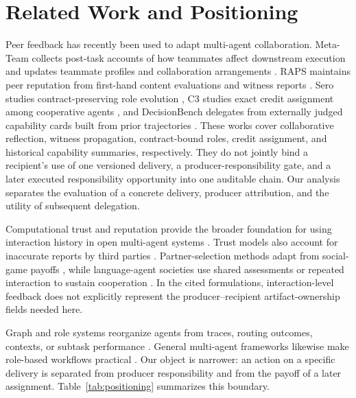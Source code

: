 \documentclass[sigconf,anonymous]{aamas}
\begin{document}
\section{Related Work and Positioning}
Peer feedback has recently been used to adapt multi-agent collaboration. Meta-Team collects post-task accounts of how teammates affect downstream execution and updates teammate profiles and collaboration arrangements \cite{hao2026metateam}. RAPS maintains peer reputation from first-hand content evaluations and witness reports \cite{li2026raps}. Sero studies contract-preserving role evolution \cite{ge2026sero}, C3 studies exact credit assignment among cooperative agents \cite{chen2026c3}, and DecisionBench delegates from externally judged capability cards built from prior trajectories \cite{gao2026decisionbench}. These works cover collaborative reflection, witness propagation, contract-bound roles, credit assignment, and historical capability summaries, respectively. They do not jointly bind a recipient's use of one versioned delivery, a producer-responsibility gate, and a later executed responsibility opportunity into one auditable chain. Our analysis separates the evaluation of a concrete delivery, producer attribution, and the utility of subsequent delegation.

Computational trust and reputation provide the broader foundation for using interaction history in open multi-agent systems \cite{sabater2002reputation,pinyol2013trust}. Trust models also account for inaccurate reports by third parties \cite{teacy2006travos}. Partner-selection methods adapt from social-game payoffs \cite{leung2024partner,leung2025partner,russell2026partner}, while language-agent societies use shared assessments or repeated interaction to sustain cooperation \cite{ren2026reputation,piatti2024cooperate,akata2025repeated}. In the cited formulations, interaction-level feedback does not explicitly represent the producer--recipient artifact-ownership fields needed here.

Graph and role systems reorganize agents from traces, routing outcomes, contexts, or subtask performance \cite{yang2025agentnet,zhuge2024gptswarm,zhang2026dynamic,li2026morse}. General multi-agent frameworks likewise make role-based workflows practical \cite{wu2023autogen,metagpt2024,agentverse2024}. Our object is narrower: an action on a specific delivery is separated from producer responsibility and from the payoff of a later assignment. Table~\ref{tab:positioning} summarizes this boundary.
\end{document}

